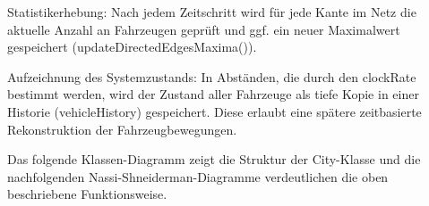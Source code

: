Statistikerhebung: Nach jedem Zeitschritt wird für jede Kante im Netz die aktuelle Anzahl an Fahrzeugen geprüft und ggf. ein neuer Maximalwert gespeichert (updateDirectedEdgesMaxima()).

Aufzeichnung des Systemzustands: In Abständen, die durch den clockRate bestimmt werden,
wird der Zustand aller Fahrzeuge als tiefe Kopie in einer Historie (vehicleHistory) gespeichert.
Diese erlaubt eine spätere zeitbasierte Rekonstruktion der Fahrzeugbewegungen.

Das folgende Klassen-Diagramm zeigt die Struktur der City-Klasse und die nachfolgenden Nassi-Shneiderman-Diagramme verdeutlichen die oben beschriebene Funktionsweise.

\begin{figure}[h!]
    \centering
\end{figure}


